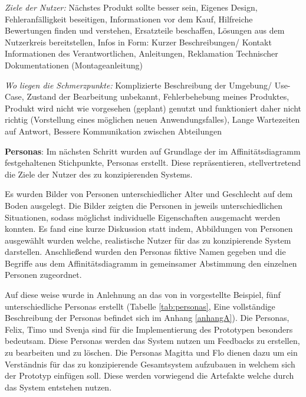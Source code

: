 \vspace{2mm}
\textit{Ziele der Nutzer: } 
Nächstes Produkt sollte besser sein, Eigenes Design, Fehleranfälligkeit beseitigen, Informationen vor dem Kauf, Hilfreiche Bewertungen finden und verstehen, Ersatzteile beschaffen, Lösungen aus dem Nutzerkreis bereitstellen, Infos in Form: Kurzer Beschreibungen/ Kontakt Informationen des Verantwortlichen, Anleitungen, Reklamation Technischer Dokumentationen (Montageanleitung)

\vspace{2mm}
\textit{Wo liegen die Schmerzpunkte: } 
Komplizierte Beschreibung der Umgebung/ Use-Case, Zustand der Bearbeitung unbekannt, Fehlerbehebung meines Produktes, Produkt wird nicht wie vorgesehen (geplant) genutzt und funktioniert daher nicht richtig (Vorstellung eines möglichen neuen Anwendungsfalles), Lange Wartezeiten auf Antwort, Bessere Kommunikation zwischen Abteilungen

\textbf{Personas}:
Im nächsten Schritt wurden auf Grundlage der im  Affinitätsdiagramm festgehaltenen Stichpunkte, Personas erstellt. Diese repräsentieren, stellvertretend die Ziele der 
Nutzer des zu konzipierenden Systems.

Es wurden Bilder von Personen unterschiedlicher Alter und Geschlecht auf dem Boden ausgelegt. Die Bilder zeigten die Personen in jeweils unterschiedlichen Situationen, 
sodass möglichst individuelle Eigenschaften ausgemacht werden konnten. Es fand eine kurze Diskussion statt indem, Abbildungen von Personen ausgewählt wurden welche, realistische 
Nutzer für das zu konzipierende System darstellen. Anschließend wurden den Personas fiktive Namen gegeben und die Begriffe aus dem Affinitätsdiagramm in gemeinsamer Abstimmung den 
einzelnen Personen zugeordnet. 

Auf diese weise wurde in Anlehnung an das von \citeauthor{DieterSchmalstieg2016} in \cite[S.~57]{DieterSchmalstieg2016} vorgestellte Beispiel, fünf unterschiedliche Personas erstellt (Tabelle \ref{tab:personas}, Eine vollständige Beschreibung der Personas befindet sich im Anhang \ref{anhangA}). Die Personas, Felix, Timo und Svenja sind für die Implementierung des Prototypen besonders bedeutsam. Diese Personas werden das System nutzen um Feedbacks zu erstellen, 
zu bearbeiten und zu löschen. Die Personas Magitta und Flo dienen dazu um ein Verständnis für das zu konzipierende Gesamtsystem aufzubauen in welchem sich der Prototyp einfügen soll. Diese werden vorwiegend die Artefakte 
welche durch das System entstehen nutzen. 

